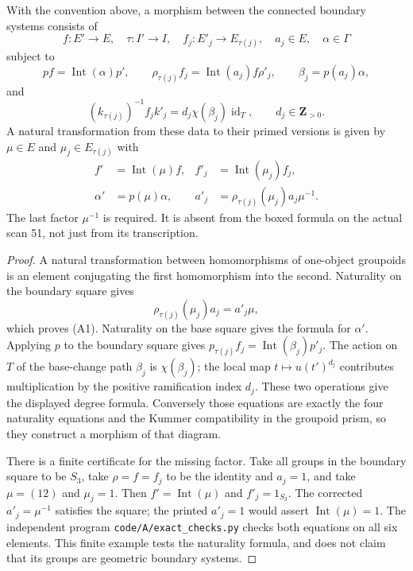 \begin{proposition}
\label{A:two-morphisms}
With the convention above, a morphism between the connected boundary
systems consists of
\[
 f:E'\to E,\quad \tau:I'\to I,\quad f_j:E'_j\to E_{\tau(j)},
 \quad a_j\in E,\quad \alpha\in\Gamma
\]
subject to
\[
 pf=\operatorname{Int}(\alpha)p',\qquad
 \rho_{\tau(j)}f_j=\operatorname{Int}(a_j)f\rho'_j,
 \qquad \beta_j=p(a_j)\alpha,
\]
and
\[
 (k_{\tau(j)})^{-1}f_jk'_j
       =d_j\chi(\beta_j)\operatorname{id}_T,
       \qquad d_j\in\mathbf Z_{>0}.
\]
A natural transformation from these data to their primed versions is
given by $\mu\in E$ and $\mu_j\in E_{\tau(j)}$ with
\[
\begin{aligned}
 f'&=\operatorname{Int}(\mu)f,&
 f'_j&=\operatorname{Int}(\mu_j)f_j,\\
 \alpha'&=p(\mu)\alpha,&
 a'_j&=\rho_{\tau(j)}(\mu_j)a_j\mu^{-1}.
\end{aligned}                                                  \tag{A1}
\]
The last factor $\mu^{-1}$ is required.  It is absent from the boxed
formula on the actual scan 51, not just from its transcription.
\end{proposition}
\begin{proof}
A natural transformation between homomorphisms of one-object
groupoids is an element conjugating the first homomorphism into the
second.  Naturality on the boundary square gives
\[
 \rho_{\tau(j)}(\mu_j)a_j=a'_j\mu,
\]
which proves (A1).  Naturality on the base square gives the formula
for $\alpha'$.  Applying $p$ to the boundary square gives
$p_{\tau(j)}f_j=\operatorname{Int}(\beta_j)p'_j$.  The action on
$T$ of the base-change path $\beta_j$ is $\chi(\beta_j)$; the
local map $t\mapsto u(t')^{d_j}$ contributes multiplication by the
positive ramification index $d_j$.  These two operations give the
displayed degree formula.  Conversely those equations are exactly
the four naturality equations and the Kummer compatibility in the
groupoid prism, so they construct a morphism of that diagram.

There is a finite certificate for the missing factor.  Take all
groups in the boundary square to be $S_3$, take $\rho=f=f_j$ to be
the identity and $a_j=1$, and take $\mu=(12)$ and $\mu_j=1$.
Then $f'=\operatorname{Int}(\mu)$ and $f'_j=1_{S_3}$.
The corrected $a'_j=\mu^{-1}$ satisfies the square; the printed
$a'_j=1$ would assert $\operatorname{Int}(\mu)=1$.  The independent
program \texttt{code/A/exact\_checks.py} checks both equations on
all six elements.  This finite example tests the naturality formula,
and does not claim that its groups are geometric boundary systems.
\end{proof}

